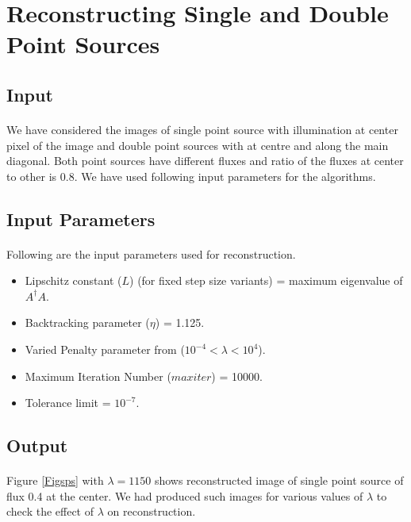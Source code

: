 \section{Reconstructing Single and Double Point Sources}
\label{s:results_main}

\subsection{Input}
\label{s:results_input}
\paragraph{}We have considered the images of single point source with illumination 
at center pixel of the image and double point sources with at centre
and along the main diagonal. Both point sources have different fluxes and 
ratio of the fluxes at center to other is 0.8. We have used following input parameters
for the algorithms. 

\subsection{Input Parameters}
\label{s:results_input_p}
\paragraph{} Following are the input parameters used for reconstruction. 
\begin{itemize}
 \item Lipschitz constant ($L$) (for fixed step size variants) = maximum eigenvalue of $A^\dagger A$.
 \item Backtracking parameter ($\eta$) = 1.125.
 \item Varied Penalty parameter from ($10^{-4} < \lambda < 10^4$).
 \item Maximum Iteration Number ($maxiter$) = 10000.
 \item Tolerance limit = $10^{-7}$.
\end{itemize}

\subsection{Output}
\label{s:results_output}

\paragraph{}Figure \ref{Figsps} with $\lambda=1150$ shows reconstructed image of single point source of flux 0.4 at the center.
We had produced such images for various values of $\lambda$ to check the effect of $\lambda$ on
reconstruction. 

